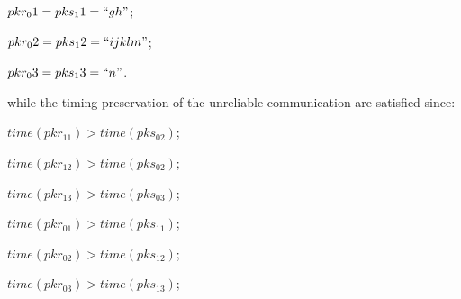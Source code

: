 $pkr_01 = pks_11=``gh"$;

$pkr_02 = pks_12=``ijklm"$;

$pkr_03 = pks_13=``n"$.

while the timing preservation of the unreliable communication are satisfied since: 

$time(pkr_11) > time(pks_02)$;

$time(pkr_12) > time(pks_02)$; 

$time(pkr_13) > time(pks_03)$;

$time(pkr_01) > time(pks_11)$;

$time(pkr_02) > time(pks_12)$;

$time(pkr_03) > time(pks_13)$;




